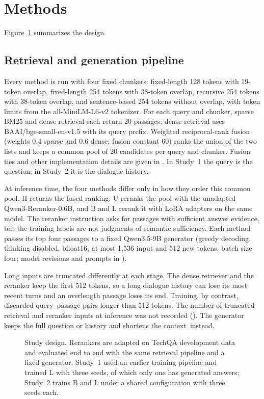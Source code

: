 \section{Methods}\label{sec:pipeline}
Figure~\ref{fig:design} summarizes the design.

\subsection{Retrieval and generation pipeline}
Every method is run with four fixed chunkers: fixed-length 128 tokens with 19-token overlap, fixed-length 254 tokens with 38-token overlap, recursive 254 tokens with 38-token overlap, and sentence-based 254 tokens without overlap, with token limits from the all-MiniLM-L6-v2 tokenizer. For each query and chunker, sparse BM25 and dense retrieval each return 20 passages; dense retrieval uses BAAI/bge-small-en-v1.5 with its query prefix. Weighted reciprocal-rank fusion (weights 0.4 sparse and 0.6 dense; fusion constant 60) ranks the union of the two lists and keeps a common pool of 20 candidates per query and chunker. Fusion ties and other implementation details are given in . In Study~1 the query is the question; in Study~2 it is the dialogue history.

At inference time, the four methods differ only in how they order this common pool. H returns the fused ranking. U reranks the pool with the unadapted Qwen3-Reranker-0.6B, and B and L rerank it with LoRA adapters on the same model. The reranker instruction asks for passages with sufficient answer evidence, but the training labels are not judgments of semantic sufficiency. Each method passes its top four passages to a fixed Qwen3.5-9B generator (greedy decoding, thinking disabled, bfloat16, at most 1,536 input and 512 new tokens, batch size four; model revisions and prompts in ).

Long inputs are truncated differently at each stage. The dense retriever and the reranker keep the first 512 tokens, so a long dialogue history can lose its most recent turns and an overlength passage loses its end. Training, by contrast, discarded query--passage pairs longer than 512 tokens. The number of truncated retrieval and reranker inputs at inference was not recorded (). The generator keeps the full question or history and shortens the context~instead.
\begin{figure}[htbp]\centering

\caption{Study design. Rerankers are adapted on TechQA development data and evaluated end to end with the same retrieval pipeline and a fixed generator. Study~1 used an earlier training pipeline and trained L with three seeds, of which only one has generated answers; Study~2 trains B and L under a shared configuration with three seeds each.}\label{fig:design}
\end{figure}

